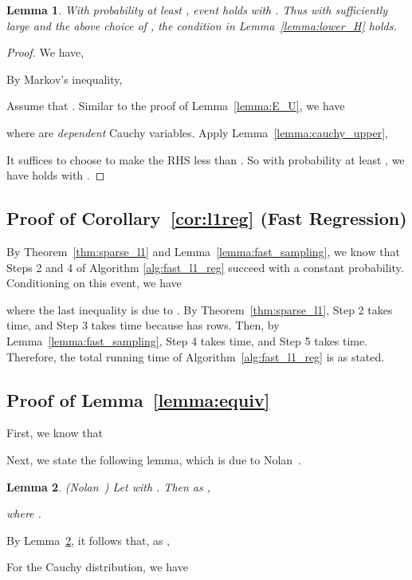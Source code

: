 \documentclass[11pt]{article}
\newtheorem{lemma}{Lemma}
\begin{document}
\begin{lemma}
  With probability at least , event  holds with
  .
  Thus with  sufficiently large and the above choice of , the
  condition in Lemma~\ref{lemma:lower_H}  holds.
\end{lemma}
\begin{proof}
  We have,
  
  By Markov's inequality,
  
  Assume that .
  Similar to the proof of Lemma~\ref{lemma:E_U}, we have
  
  where  are \emph{dependent} Cauchy variables.
  Apply Lemma~\ref{lemma:cauchy_upper},
  
  It suffices to choose  to make the RHS less
  than .
  So with probability at least , we have  holds with
  .
\end{proof}


\subsection{Proof of Corollary~\ref{cor:l1reg} (Fast  Regression)}
\label{sxn:pf-cor-l1reg}

By Theorem~\ref{thm:sparse_l1} and Lemma~\ref{lemma:fast_sampling}, we know that
Steps 2 and 4 of Algorithm \ref{alg:fast_l1_reg} succeed with a constant
probability. 
Conditioning on this event, we have

where the last inequality is due to .
By Theorem~\ref{thm:sparse_l1}, Step 2 takes  time, and Step 3
takes  time because  has  rows.
Then, by Lemma~\ref{lemma:fast_sampling}, Step 4 takes  time, and Step 5 takes  time.
Therefore, the total running time of Algorithm~\ref{alg:fast_l1_reg} is as
stated.



\subsection{Proof of Lemma~\ref{lemma:equiv}}
\label{sxn:pf-equiv}

First, we know that

Next, we state the following lemma, which is due to
Nolan~\cite{nolan2012stable}.
\begin{lemma}
  \label{lemma:tail}
  (Nolan~\cite[Thm.~1.12]{nolan2012stable}) Let  with .
  Then as ,
  
  where .
\end{lemma}
\noindent
By Lemma~\ref{lemma:tail}, it follows that, as ,

For the Cauchy distribution, we have
\end{document}
